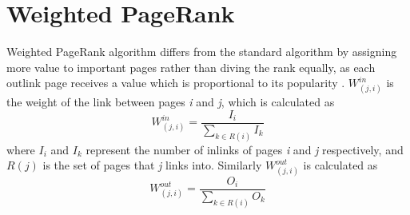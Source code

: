 \documentclass[11pt]{report}
\begin{document}
\section{Weighted PageRank}\label{sec:weighted}

Weighted PageRank algorithm differs from the standard algorithm by assigning more value to important pages rather than diving the rank equally, as each outlink page receives a value which is proportional to its popularity \cite{xing2004weighted}. $W^{in}_{(j,i)}$ is the weight of the link between pages \textit{i} and \textit{j}, which is calculated as 
\begin{equation}\label{eq:weightin}
W^{in}_{(j,i)} = \frac{I_i}{\sum_{k\in R(i)}I_k}
\end{equation}
where $I_i$ and $I_k$ represent the number of inlinks of pages \textit{i} and \textit{j} respectively, and $R(j)$ is the set of pages that \textit{j} links into. 
Similarly $W^{out}_{(j,i)}$ is calculated as
\begin{equation}\label{eq:weightout}
W^{out}_{(j,i)} = \frac{O_i}{\sum_{k\in R(i)}O_k}
\end{equation}
\end{document}
